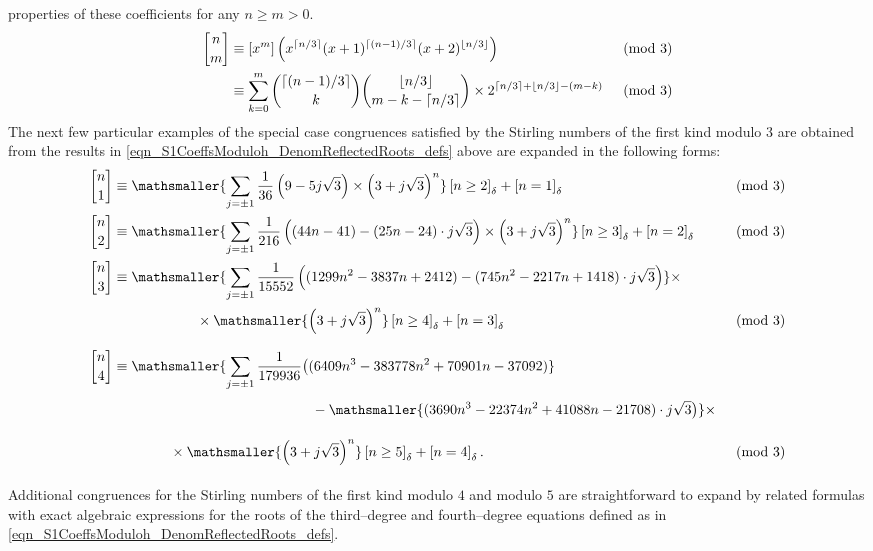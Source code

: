 \documentclass[12pt,reqno]{article}
\numberwithin{sfootnote}{section}
\numberwithin{equation}{section}
\theoremstyle{DefaultTheoremStyle}
\theoremstyle{definition}
\newcommand{\gkpSI}[2]{\ensuremath{\genfrac{\lbrack}{\rbrack}{0pt}{}{#1}{#2}}}
\newcommand{\Iverson}[1]{\ensuremath{\left[#1\right]_{\delta}}}
\begin{document}
properties of these coefficients for any $n \geq m > 0$. 
\begin{align*} 
\gkpSI{n}{m} & \equiv 
     [x^m] \left( 
     x^{\lceil n/3 \rceil} (x+1)^{\lceil (n-1)/3 \rceil} 
     (x+2)^{\lfloor n/3 \rfloor} 
     \right) && \pmod{3} \\ 
     & \equiv 
     \sum_{k=0}^{m} \binom{\lceil (n-1)/3 \rceil}{k} 
     \binom{\lfloor n/3 \rfloor}{m-k - \lceil n/3 \rceil} \times 
     2^{\lceil n/3 \rceil + \lfloor n/3 \rfloor -(m-k)} && \pmod{3} 
\end{align*} 
The next few particular examples of the 
special case congruences 
satisfied by the Stirling numbers of the first kind modulo $3$ 
are obtained from the results in 
\eqref{eqn_S1CoeffsModuloh_DenomReflectedRoots_defs} 
above are expanded in the following forms: 
\begin{align*} 
\gkpSI{n}{1} & \equiv 
     \mathsmaller{ 
     \sum\limits_{j = \pm 1} 
     \frac{1}{36} \left(9-5 j\sqrt{3}\right) 
     \times \left(3+j\sqrt{3}\right)^{n} 
     } 
     \Iverson{n \geq 2} + \Iverson{n = 1} && \pmod{3} \\ 
\gkpSI{n}{2} & \equiv 
     \mathsmaller{ 
     \sum\limits_{j = \pm 1} 
     \frac{1}{216} \left((44n-41)-(25n-24) \cdot j\sqrt{3}\right) 
     \times \left(3+j\sqrt{3}\right)^{n} 
     } 
     \Iverson{n \geq 3} + \Iverson{n = 2} && \pmod{3} \\ 
\gkpSI{n}{3} & \equiv 
     \mathsmaller{ 
     \sum\limits_{j = \pm 1} 
     \frac{1}{15552} \left((1299n^2-3837n+2412)- 
     (745n^2-2217n+1418) \cdot j\sqrt{3}\right) 
     } \times && \\ 
     & \phantom{\equiv \sum\limits_{j = \pm 1} \frac{1}{15552}} \times 
     \mathsmaller{ 
     \left(3+j\sqrt{3}\right)^{n} 
     } 
     \Iverson{n \geq 4} + \Iverson{n = 3} && \pmod{3} \\ 
\gkpSI{n}{4} & \equiv 
     \mathsmaller{ 
     \sum\limits_{j = \pm 1} 
     \frac{1}{179936} \bigl((6409n^3-383778n^2+70901n-37092) 
     } && \\ 
     & \phantom{\equiv\mathsmaller{\sum\limits_{j=\pm 1} 
                \frac{1}{179936}}\bigl(} - 
     \mathsmaller{ 
     (3690n^3-22374n^2+41088n-21708) \cdot j\sqrt{3}\bigr) 
     } \times && \\ 
     & \phantom{\equiv \sum\limits_{j = \pm 1} \quad } \times 
     \mathsmaller{ 
     \left(3+j\sqrt{3}\right)^{n} 
     } 
     \Iverson{n \geq 5} + \Iverson{n = 4}. && \pmod{3} 
\end{align*} 
Additional congruences for the Stirling numbers of the first kind 
modulo $4$ and modulo $5$ are straightforward to expand by 
related formulas with exact 
algebraic expressions for the roots of the third--degree and 
fourth--degree equations defined as in 
\eqref{eqn_S1CoeffsModuloh_DenomReflectedRoots_defs}. 
\end{document}
